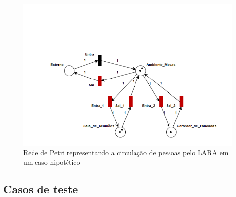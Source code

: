  \begin{figure}[H]
    \centering
    \includegraphics[width=0.8\linewidth]{figs/Metodologia/Petri_net2.png}
    \caption{Rede de Petri representando a circulação de pessoas pelo LARA em um caso hipotético}
    \label{fig:Petri2}
\end{figure}
 
 

 
 
 
 
 \subsection{Casos de teste}
 

